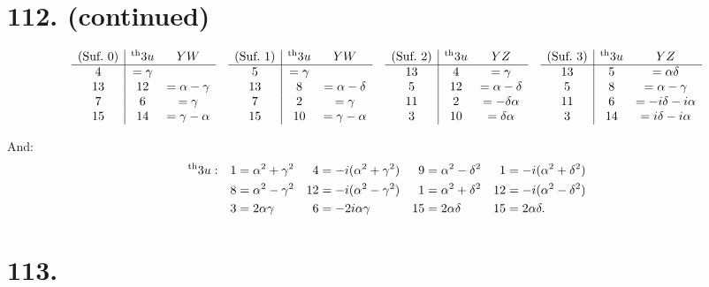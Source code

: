 \documentclass[11pt,a4paper]{book}
\providecommand{\uth}{\textsuperscript{th}}
\begin{document}
\newpage
\section*{112. (continued)}
\label{sec:112cont}

\[
\begin{array}{c|cc}
\text{(Suf.~0)} & \uth{3}u & YW \\
\hline
4 & = \gamma \\
13 & 12 & = \alpha - \gamma \\
7 & 6 & = \gamma \\
15 & 14 & = \gamma - \alpha
\end{array}
\quad
\begin{array}{c|cc}
\text{(Suf.~1)} & \uth{3}u & YW \\
\hline
5 & = \gamma \\
13 & 8 & = \alpha - \delta \\
7 & 2 & = \gamma \\
15 & 10 & = \gamma - \alpha
\end{array}
\quad
\begin{array}{c|cc}
\text{(Suf.~2)} & \uth{3}u & YZ \\
\hline
13 & 4 & = \gamma \\
5 & 12 & = \alpha - \delta \\
11 & 2 & = -\delta\alpha \\
3 & 10 & = \delta\alpha
\end{array}
\quad
\begin{array}{c|cc}
\text{(Suf.~3)} & \uth{3}u & YZ \\
\hline
13 & 5 & = \alpha\delta \\
5 & 8 & = \alpha - \gamma \\
11 & 6 & = -i\delta - i\alpha \\
3 & 14 & = i\delta - i\alpha
\end{array}
\]

And:
\begin{align*}
\uth{3}u: && 1 &= \alpha^2 + \gamma^2 & 4 &= -i(\alpha^2 + \gamma^2) & 9 &= \alpha^2 - \delta^2 & 1 &= -i(\alpha^2 + \delta^2) \\
&& 8 &= \alpha^2 - \gamma^2 & 12 &= -i(\alpha^2 - \gamma^2) & 1 &= \alpha^2 + \delta^2 & 12 &= -i(\alpha^2 - \delta^2) \\
&& 3 &= 2\alpha\gamma & 6 &= -2i\alpha\gamma & 15 &= 2\alpha\delta & 15 &= 2\alpha\delta.
\end{align*}

\newpage
\section*{113.}
\label{sec:113}
\end{document}
